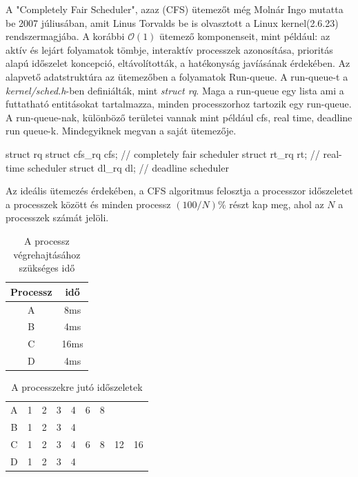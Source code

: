 A "Completely Fair Scheduler", azaz (CFS) ütemezőt még Molnár Ingo mutatta be 2007 júliusában, amit Linus Torvalds be is olvasztott a Linux kernel(2.6.23) rendszermagjába. A korábbi $\mathcal{O}(1)$ ütemező komponenseit, mint például: az aktív és lejárt folyamatok tömbje, interaktív processzek azonosítása, prioritás alapú időszelet koncepció, eltávolították, a hatékonyság javíásának érdekében. 
Az alapvető adatstruktúra az ütemezőben a folyamatok Run-queue. A run-queue-t a \textit{kernel/sched.h}-ben definiálták, mint \textit{struct rq}. Maga a run-queue egy lista ami a futtatható entitásokat tartalmazza, minden processzorhoz tartozik egy run-queue. A run-queue-nak, különböző területei vannak mint például cfs, real time, deadline run queue-k.
Mindegyiknek megvan a saját ütemezője.
\begin{cpp}
struct rq {
      struct cfs_rq cfs;  // completely fair scheduler
      struct rt_rq rt;    // real-time scheduler
      struct dl_rq dl;    // deadline scheduler
}
\end{cpp}

Az ideális ütemezés érdekében, a CFS algoritmus felosztja a processzor időszeletet a processzek között és minden processz $(100/N)\%$ részt kap meg, ahol az $N$ a processzek számát jelöli.
\begin{table}[h]
\centering
\caption{A processz végrehajtásához szükséges idő}
\label{tab:processtimes}
\begin{tabular}{|c|c|}
\hline
Processz & idő \\
\hline
A & 8ms \\
B & 4ms \\
C & 16ms \\
D & 4ms \\
\hline
\end{tabular}
\end{table}

\begin{table}[h]
\centering
\caption{A processzekre jutó időszeletek}
\label{tab:timeslices}
\begin{tabular}{|c|c|c|c|c|c|c|c|c|}
\hline
A & 1 & 2 & 3 & 4 & 6 & 8 & & \\
B & 1 & 2 & 3 & 4 & & & & \\
C & 1 & 2 & 3 & 4 & 6 & 8 & 12 & 16 \\
D & 1 & 2 & 3 & 4 & & & & \\
\hline
\end{tabular}
\end{table}

